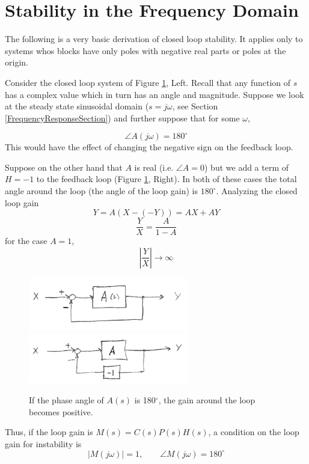 \section{Stability in the Frequency Domain}






The following is a very basic derivation of closed loop stability.  It applies only to systems whos blocks have only poles with negative real parts or poles at the origin.

Consider the closed loop system of Figure \ref{NyquistLoop}, Left.  Recall that any function of $s$ has a complex value which in turn has an angle and magnitude.  Suppose we look at the steady state sinusoidal domain ($s=j\omega$, see Section \ref{FrequencyResponseSection}) and further suppose that for some $\omega$,

$$
\angle A(j\omega) = 180^\circ
$$
This would have the effect of changing the negative sign on the feedback loop.


Suppose on the other hand that $A$ is real (i.e. $\angle A = 0$) but we add a term of $H=-1$ to the feedback loop (Figure \ref{NyquistLoop}, Right).  In both of these cases the total angle around the loop (the angle of the loop gain) is $180^\circ$.    Analyzing the closed loop gain
\[
Y = A(X-(-Y)) = AX + AY
\]
\[
\frac{Y}{X}  = \frac {A} {1-A}
\]
for the case $A=1$,
\[
|\frac{Y}{X}| \to \infty
\]


\begin{figure}\centering
\includegraphics[width=2.75in]{figs06/00792a.png}
\includegraphics[width=2.75in]{figs06/00793a.png}
\caption{If the phase angle of $A(s)$ is 180$^\circ$, the gain around the loop becomes positive.}\label{NyquistLoop}
\end{figure}


Thus, if the loop gain is $M(s) = C(s)P(s)H(s)$, a condition on the loop gain for instability is
\[
\left | M(j\omega) \right | = 1, \qquad \angle M(j\omega) = 180^\circ
\]

